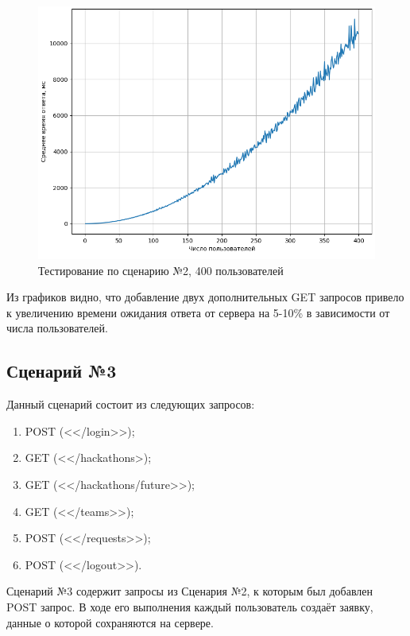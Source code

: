 \begin{figure}[H]
	\begin{center}
		\includegraphics[page=1,scale=0.8]{assets/exp2_400.png}
	\end{center}
	\caption{Тестирование по сценарию №2, 400 пользователей}
	\label{test2_2}
\end{figure}

Из графиков видно, что добавление двух дополнительных GET запросов привело к увеличению времени ожидания ответа от сервера на 5-10\% в зависимости от числа пользователей. 


\subsection{Сценарий №3}

Данный сценарий состоит из следующих запросов:

\begin{enumerate}[label={\arabic*)}]
    \item POST (<</login>>);
    \item GET (<</hackathons>);
    \item GET (<</hackathons/future>>);
    \item GET (<</teams>>);
    \item POST (<</requests>>);
    \item POST (<</logout>>).
\end{enumerate}

Сценарий №3 содержит запросы из Сценария №2, к которым был добавлен POST запрос. В ходе его выполнения каждый пользователь создаёт заявку, данные о которой сохраняются на сервере. 

